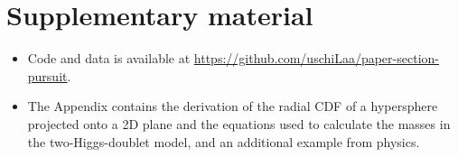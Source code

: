 \documentclass[]{interact}
\theoremstyle{plain}%
\theoremstyle{definition}
\theoremstyle{remark}
\def\tightlist{}
\begin{document}
\hypertarget{supplementary-material}{%
\section*{Supplementary material}\label{supplementary-material}}

\begin{itemize}
\tightlist
\item
  Code and data is available at
  \url{https://github.com/uschiLaa/paper-section-pursuit}.
\item
  The Appendix contains the derivation of the radial CDF of a
  hypersphere projected onto a 2D plane and the equations used to
  calculate the masses in the two-Higgs-doublet model, and an additional
  example from physics.
\end{itemize}



\end{document}
